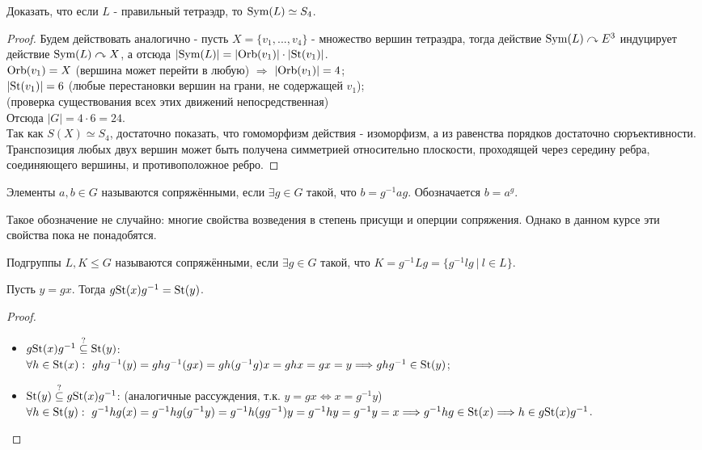 \begin{exercise}
    Доказать, что если $L$ - правильный тетраэдр, то $\textup{Sym}(L) \simeq S_4$.
\end{exercise}
\begin{proof}
    Будем действовать аналогично - пусть $X = \{v_1,...,v_4\}$ - множество вершин тетраэдра, тогда действие $\textup{Sym}(L) \curvearrowright E^3$ индуцирует действие $\textup{Sym}(L) \curvearrowright X$, а отсюда $|\textup{Sym}(L)| = |\textup{Orb}(v_1)|\cdot |\textup{St}(v_1)|$.\\
    $\textup{Orb}(v_1) = X$ (вершина может перейти в любую) $\Longrightarrow$ $|\textup{Orb}(v_1)| = 4$;\\
    $|\textup{St}(v_1)| = 6$ (любые перестановки вершин на грани, не содержащей $v_1$);\\
    (проверка существования всех этих движений непосредственная)\\
    Отсюда $|G| = 4 \cdot 6 = 24$.\\
    Так как $S(X) \simeq S_4$, достаточно показать, что гомоморфизм действия - изоморфизм, а из равенства порядков достаточно сюръективности. Транспозиция любых двух вершин может быть получена симметрией относительно плоскости, проходящей через середину ребра, соединяющего вершины, и противоположное ребро.
\end{proof}
\begin{definition}
    Элементы $a, b \in G$ называются сопряжёнными, если $\exists g \in G$ такой, что $b = g^{-1}ag$. Обозначается $b = a^g$.
\end{definition}
\begin{remark}
    Такое обозначение не случайно: многие свойства возведения в степень присущи и оперции сопряжения. Однако в данном курсе эти свойства пока не понадобятся. 
\end{remark}
\begin{definition}
    Подгруппы $L, K \leq G$ называются сопряжёнными, если $\exists g \in G$ такой, что $K = g^{-1}Lg = \{g^{-1}lg \ | \ l \in L\}$.
\end{definition}
\begin{subtheorem}
    Пусть $y = gx$. Тогда $g\textup{St}(x)g^{-1} = \textup{St}(y)$.
\end{subtheorem}
\begin{proof}\tab
    \begin{itemize}
        \item $g\textup{St}(x)g^{-1} \overset{?}{\subseteq} \textup{St}(y)$:\\
        $\forall h \in \textup{St}(x): \ ghg^{-1}(y) = ghg^{-1}(gx) = gh(g^{-1}g)x = ghx = gx = y \Longrightarrow ghg^{-1} \in \textup{St}(y)$;
        \item $\textup{St}(y) \overset{?}{\subseteq} g\textup{St}(x)g^{-1}$: (аналогичные рассуждения, т.к. $y = gx \Longleftrightarrow x = g^{-1}y$)\\
        $\forall h \in \textup{St}(y): \ g^{-1}hg(x) = g^{-1}hg(g^{-1}y) = g^{-1}h(gg^{-1})y = g^{-1}hy = g^{-1}y = x \Longrightarrow g^{-1}hg \in \textup{St}(x) \Longrightarrow h \in g \textup{St}(x)g^{-1}$.
    \end{itemize}
\end{proof}
